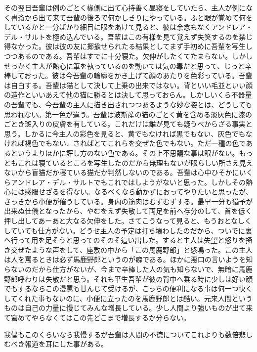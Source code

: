 \documentclass[12pt, openright]{book}
\begin{document}
その翌日吾輩は例のごとく椽側に出て心持善く昼寝をしていたら、主人が例になく書斎から出て来て吾輩の後ろで何かしきりにやっている。ふと眼が覚めて何をしているかと一分ばかり細目に眼をあけて見ると、彼は余念もなくアンドレア・デル・サルトを極め込んでいる。吾輩はこの有様を見て覚えず失笑するのを禁じ得なかった。彼は彼の友に揶揄せられたる結果としてまず手初めに吾輩を写生しつつあるのである。吾輩はすでに十分寝た。欠伸がしたくてたまらない。しかしせっかく主人が熱心に筆を執っているのを動いては気の毒だと思って、じっと辛棒しておった。彼は今吾輩の輪廓をかき上げて顔のあたりを色彩っている。吾輩は自白する。吾輩は猫として決して上乗の出来ではない。背といい毛並といい顔の造作といいあえて他の猫に勝るとは決して思っておらん。しかしいくら不器量の吾輩でも、今吾輩の主人に描き出されつつあるような妙な姿とは、どうしても思われない。第一色が違う。吾輩は波斯産の猫のごとく黄を含める淡灰色に漆のごとき斑入りの皮膚を有している。これだけは誰が見ても疑うべからざる事実と思う。しかるに今主人の彩色を見ると、黄でもなければ黒でもない、灰色でもなければ褐色でもない、さればとてこれらを交ぜた色でもない。ただ一種の色であるというよりほかに評し方のない色である。その上不思議な事は眼がない。もっともこれは寝ているところを写生したのだから無理もないが眼らしい所さえ見えないから盲猫だか寝ている猫だか判然しないのである。吾輩は心中ひそかにいくらアンドレア・デル・サルトでもこれではしようがないと思った。しかしその熱心には感服せざるを得ない。なるべくなら動かずにおってやりたいと思ったが、さっきから小便が催うしている。身内の筋肉はむずむずする。最早一分も猶予が出来ぬ仕儀となったから、やむをえず失敬して両足を前へ存分のして、首を低く押し出してあーあと大なる欠伸をした。さてこうなって見ると、もうおとなしくしていても仕方がない。どうせ主人の予定は打ち壊わしたのだから、ついでに裏へ行って用を足そうと思ってのそのそ這い出した。すると主人は失望と怒りを掻き交ぜたような声をして、座敷の中から「この馬鹿野郎」と怒鳴った。この主人は人を罵るときは必ず馬鹿野郎というのが癖である。ほかに悪口の言いようを知らないのだから仕方がないが、今まで辛棒した人の気も知らないで、無暗に馬鹿野郎呼わりは失敬だと思う。それも平生吾輩が彼の背中へ乗る時に少しは好い顔でもするならこの漫罵も甘んじて受けるが、こっちの便利になる事は何一つ快くしてくれた事もないのに、小便に立ったのを馬鹿野郎とは酷い。元来人間というものは自己の力量に慢じてみんな増長している。少し人間より強いものが出て来て窘めてやらなくてはこの先どこまで増長するか分らない。

我儘もこのくらいなら我慢するが吾輩は人間の不徳についてこれよりも数倍悲しむべき報道を耳にした事がある。
\end{document}
